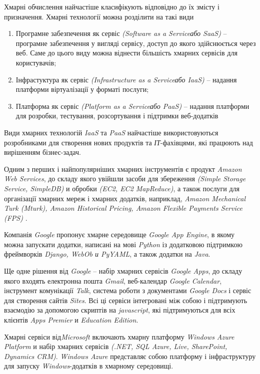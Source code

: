 Хмарні обчислення найчастіше класифікують відповідно до їх змісту і призначення. Хмарні технології можна розділити на такі види

\begin{enumerate}
\item Програмне забезпечення як сервіс {\itshape (\dq Software as a Service\dq або \dq SaaS\dq)} – програмне забезпечення у вигляді сервісу, доступ до якого здійснюється через веб. Саме до цього виду можна віднести більшість хмарних сервісів для користувачів;
\item Інфрастуктура як сервіс {\itshape (\dq Infrastructure as a Service\dq або \dq IaaS\dq)} – надання платформи віртуалізації у форматі послуги;
\item Платформа як сервіс {\itshape (\dq Platform as a Service\dq або \dq PaaS\dq)} – надання платформи для розробки, тестування, розсортування і підтримки веб-додатків
\end{enumerate}

Види хмарних технологій {\itshape IaaS} та {\itshape PaaS} найчастіше використовуються розробниками для створення нових продуктів та {\itshape ІТ}-фахівцями, які працюють над вирішенням бізнес-задач.

Одним з перших і найпопулярніших хмарних інструментів є продукт {\itshape Amazon Web Services}, до складу якого увійшли засоби для збереження {\itshape (Simple Storage Service, SimpleDB)} и обробки {\itshape (EC2, EC2 MapReduce)}, а також послуги для організації хмарних мереж і хмарних додатків, наприклад, {\itshape Amazon Mechanical Turk (Mturk), Amazon Historical Pricing, Amazon Flexible Payments Service (FPS)} .

Компанія {\itshape Google} пропонує хмарне середовище {\itshape Google App Engine}, в якому можна запускати додатки, написані на мові {\itshape Python} із додатковою підтримкою фреймворків {\itshape Django, WebOb и PyYAML}, а також додатки на {\itshape Java}.

Ще одне рішення від {\itshape Google} – набір хмарних сервісів {\itshape Google Apps}, до складу якого входять електронна пошта {\itshape Gmail}, веб-календар {\itshape Google Calendar}, інструмент комунікації {\itshape Talk}, система роботи з документами {\itshape Google Docs} і сервіс для створення сайтів {\itshape Sites}. Всі ці сервіси інтегровані між собою і підтримують взаємодію за допомогою скриптів на {\itshape javascript}, які підтримуються для всіх клієнтів {\itshape Apps Premier} и {\itshape Education Edition}.

Хмарні сервіси від{\itshape  Microsoft} включають хмарну платформу {\itshape Windows Azure Platform} и набір хмарних сервісів {\itshape (.NET, SQL Azure, Live, SharePoint, Dynamics CRM)}. {\itshape Windows Azure} представляє собою платформу і інфраструктуру для запуску {\itshape Windows}-додатків в хмарному середовищі.

